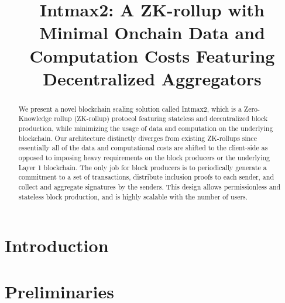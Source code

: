 \documentclass[runningheads]{llncs}
\begin{document}
%
\title{
Intmax2: A ZK-rollup with Minimal Onchain Data and Computation Costs Featuring Decentralized Aggregators
}
%
%
\author{}
%
%
\institute{}
%
\maketitle              %
%
\begin{abstract}
We present a novel blockchain scaling solution called Intmax2, which is a Zero-Knowledge rollup (ZK-rollup) protocol featuring stateless and decentralized block production, while minimizing the usage of data and computation on the underlying blockchain. Our architecture distinctly diverges from existing ZK-rollups since essentially all of the data and computational costs are shifted to the client-side as opposed to imposing heavy requirements on the block producers or the underlying Layer 1 blockchain. The only job for block producers is to periodically generate a commitment to a set of transactions, distribute inclusion proofs to each sender, and collect and aggregate signatures by the senders. This design allows permissionless and stateless block production, and is highly scalable with the number of users.
\end{abstract}
%
%
%

\section{Introduction}
    

\section{Preliminaries}
    

    
\end{document}
